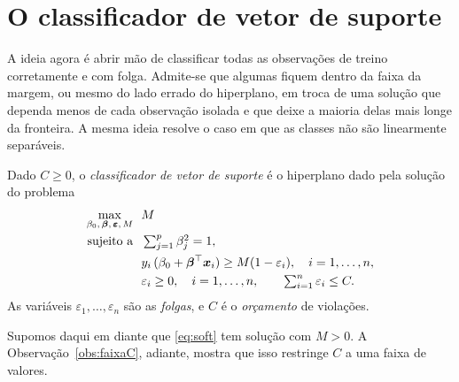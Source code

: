 \documentclass[11pt,a4paper]{article}
\begin{document}
\section{O classificador de vetor de suporte}
A ideia agora é abrir mão de classificar todas as observações de treino corretamente
e com folga. Admite-se que algumas fiquem dentro da faixa da margem, ou mesmo do lado
errado do hiperplano, em troca de uma solução que dependa menos de cada observação
isolada e que deixe a maioria delas mais longe da fronteira. A mesma ideia resolve o
caso em que as classes não são linearmente separáveis.

\begin{definicao}
Dado $C\ge0$, o \emph{classificador de vetor de suporte} é o hiperplano dado pela
solução do problema
\begin{equation}\label{eq:soft}
\begin{aligned}
  \max_{\beta_0,\,\bm{\beta},\,\bm\varepsilon,\,M}\ \ & M\\
  \text{sujeito a}\ \ & \textstyle\sum_{j=1}^p\beta_j^2=1,\\
  & y_i\,(\beta_0+\bm{\beta}^\top\bm{x}_i)\ge M(1-\varepsilon_i),\quad i=1,\dots,n,\\
  & \varepsilon_i\ge0,\quad i=1,\dots,n,\qquad \textstyle\sum_{i=1}^n\varepsilon_i\le C.
\end{aligned}
\end{equation}
As variáveis $\varepsilon_1,\dots,\varepsilon_n$ são as \emph{folgas}, e $C$ é o
\emph{orçamento} de violações.
\end{definicao}

\noindent
Supomos daqui em diante que \eqref{eq:soft} tem solução com $M>0$. A
Observação~\ref{obs:faixaC}, adiante, mostra que isso restringe $C$ a uma faixa de
valores.
\end{document}

